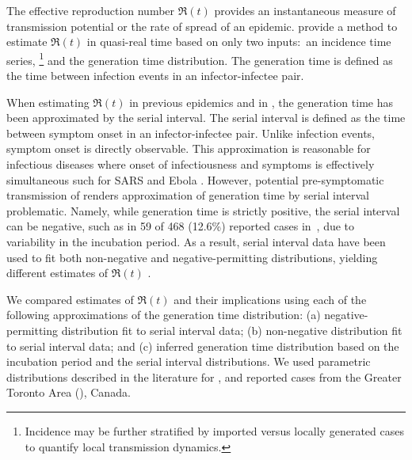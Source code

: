 The effective reproduction number $\Re(t)$ provides
an instantaneous measure of transmission potential
or the rate of spread of an epidemic.
\textcite{Cori2013} provide a method to estimate $\Re(t)$
in quasi-real time based on only two inputs:\
an incidence time series,%
\footnote{Incidence may be further stratified by
  imported versus locally generated cases
  to quantify local transmission dynamics.}
and the generation time distribution.
The generation time is defined as
the time between infection events in an infector-infectee pair.
\par
When estimating $\Re(t)$
in previous epidemics \cite{Cori2013,Ali2013,Aylward2014}
and in \covid \cite{Pan2020,Cowling2020,Leung2020,Liu2020},
the generation time has been approximated by the serial interval.
The serial interval is defined as
the time between symptom onset in an infector-infectee pair.
Unlike infection events, symptom onset is directly observable.
This approximation is reasonable for infectious diseases
where onset of infectiousness and symptoms
is effectively simultaneous \cite{Cori2013}
such for SARS and Ebola \cite{Zeng2009,Osterholm2015}.
However, potential pre-symptomatic transmission of \covid
\cite{Kimball2020,Du2020}
renders approximation of generation time by serial interval problematic.
Namely, while generation time is strictly positive,
the serial interval can be negative,
such as in 59 of 468 (12.6\%) reported cases in~\cite{Du2020},
due to variability in the incubation period.
As a result, \covid serial interval data have been used to fit both
non-negative and negative-permitting distributions,
yielding different estimates of $\Re(t)$
\cite{Du2020,Zhang2020,Ganyani2020}.
\par
We compared estimates of $\Re(t)$ and their implications using
each of the following approximations of the generation time distribution:
(a) negative-permitting distribution fit to serial interval data;
(b) non-negative distribution fit to serial interval data; and
(c) inferred generation time distribution based on
the incubation period and the serial interval distributions.
We used parametric distributions described in the literature for \covid,
and reported cases from the Greater Toronto Area (\gta), Canada.